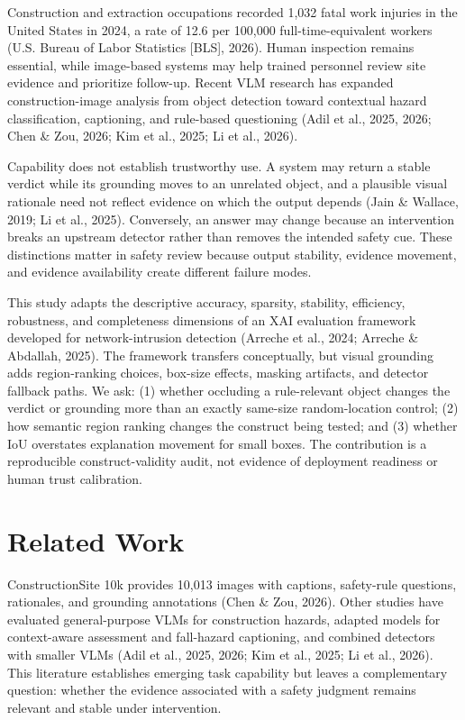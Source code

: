 \documentclass[12pt,letterpaper,twoside]{article}
\begin{document}
Construction and extraction occupations recorded 1,032 fatal work injuries in the United States in 2024, a rate of 12.6 per 100,000 full-time-equivalent workers (U.S. Bureau of Labor Statistics [BLS], 2026). Human inspection remains essential, while image-based systems may help trained personnel review site evidence and prioritize follow-up. Recent VLM research has expanded construction-image analysis from object detection toward contextual hazard classification, captioning, and rule-based questioning (Adil et al., 2025, 2026; Chen \& Zou, 2026; Kim et al., 2025; Li et al., 2026).

Capability does not establish trustworthy use. A system may return a stable verdict while its grounding moves to an unrelated object, and a plausible visual rationale need not reflect evidence on which the output depends (Jain \& Wallace, 2019; Li et al., 2025). Conversely, an answer may change because an intervention breaks an upstream detector rather than removes the intended safety cue. These distinctions matter in safety review because output stability, evidence movement, and evidence availability create different failure modes.

This study adapts the descriptive accuracy, sparsity, stability, efficiency, robustness, and completeness dimensions of an XAI evaluation framework developed for network-intrusion detection (Arreche et al., 2024; Arreche \& Abdallah, 2025). The framework transfers conceptually, but visual grounding adds region-ranking choices, box-size effects, masking artifacts, and detector fallback paths. We ask: (1) whether occluding a rule-relevant object changes the verdict or grounding more than an exactly same-size random-location control; (2) how semantic region ranking changes the construct being tested; and (3) whether IoU overstates explanation movement for small boxes. The contribution is a reproducible construct-validity audit, not evidence of deployment readiness or human trust calibration.

\section{Related Work}

ConstructionSite 10k provides 10,013 images with captions, safety-rule questions, rationales, and grounding annotations (Chen \& Zou, 2026). Other studies have evaluated general-purpose VLMs for construction hazards, adapted models for context-aware assessment and fall-hazard captioning, and combined detectors with smaller VLMs (Adil et al., 2025, 2026; Kim et al., 2025; Li et al., 2026). This literature establishes emerging task capability but leaves a complementary question: whether the evidence associated with a safety judgment remains relevant and stable under intervention.
\end{document}
